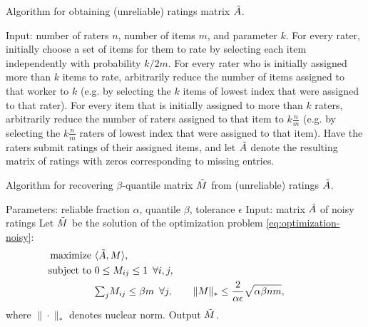 \begin{algorithm}[b!]
\caption{Algorithm for obtaining (unreliable) ratings matrix $\tilde{A}$.}
\label{alg:create-A}
\begin{algorithmic}[1]
\State Input: number of raters $n$,  number of items $m$, and parameter $k$.
\State For every rater, initially choose a set of items for them to rate by selecting each item independently with probability $k/2m$.  
\State For every rater who is initially assigned more than $k$ items to rate, arbitrarily reduce the number of items assigned to that worker to $k$ (e.g. by selecting the $k$ items of lowest index that were assigned to that rater).
\State For every item that is initially assigned to more than $k$ raters, arbitrarily reduce the number of raters assigned to that item to $k \frac{n}{m}$ (e.g. by selecting the $k \frac{n}{m}$ raters of lowest index that were assigned to that item).
\State Have the raters submit ratings of their assigned items, and let $\tilde{A}$ denote the resulting matrix of ratings with zeros corresponding to missing entries.
\end{algorithmic}
\end{algorithm}


\begin{algorithm}[b!]
\caption{Algorithm for recovering $\beta$-quantile matrix $\tilde{M}$ from 
(unreliable) ratings $\tilde{A}$.}
\label{alg:recover-M}
\begin{algorithmic}[1]
\State Parameters: reliable fraction $\alpha$, quantile $\beta$, tolerance $\epsilon$
\State Input: matrix $\tilde{A}$ of noisy ratings
\State Let $\tilde{M}$ be the solution of the optimization problem \eqref{eq:optimization-noisy}:
  \begin{align}
  \label{eq:optimization-noisy}
  \text{maximize } &\langle \tilde{A}, M \rangle, \\
  \notag \text{ subject to } &0 \leq M_{ij} \leq 1 \,\,\, \forall i,j, \\
  \notag                     &{\textstyle \sum_{j}} M_{ij} \leq \beta m \,\,\, \forall j, \quad\quad
                      \|M\|_* \leq \frac{2}{\alpha\epsilon}\sqrt{\alpha\beta nm}, \phantom{xxxxxxx}
  \end{align}
  where $\|\cdot\|_*$ denotes nuclear norm.
\State Output $\tilde{M}$.
\end{algorithmic}
\end{algorithm}
